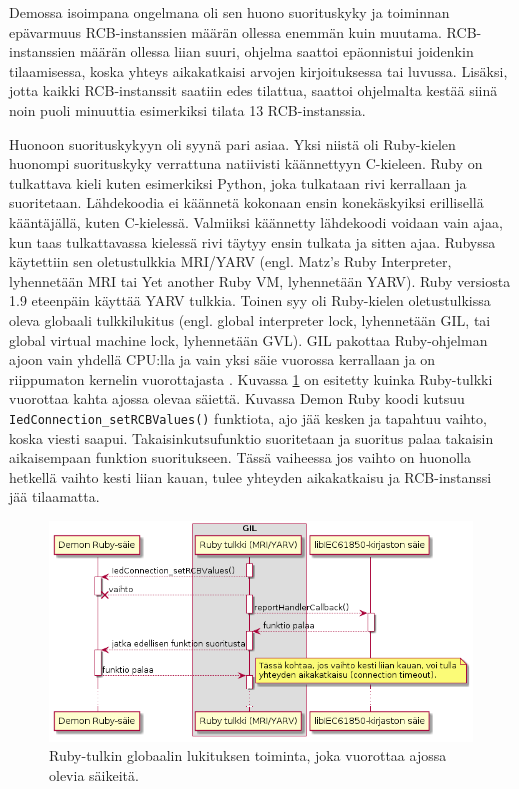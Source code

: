 Demossa isoimpana ongelmana oli sen huono suorituskyky ja toiminnan epävarmuus RCB-instanssien määrän ollessa enemmän kuin muutama. RCB-instanssien määrän ollessa liian suuri, ohjelma saattoi epäonnistui joidenkin tilaamisessa, koska yhteys aikakatkaisi arvojen kirjoituksessa tai luvussa. Lisäksi, jotta kaikki RCB-instanssit saatiin edes tilattua, saattoi ohjelmalta kestää siinä noin puoli minuuttia esimerkiksi tilata 13 RCB-instanssia.

Huonoon suorituskykyyn oli syynä pari asiaa. Yksi niistä oli Ruby-kielen huonompi suorituskyky verrattuna natiivisti käännettyyn C-kieleen. Ruby on tulkattava kieli kuten esimerkiksi Python, joka tulkataan rivi kerrallaan ja suoritetaan. Lähdekoodia ei käännetä kokonaan ensin konekäskyiksi erillisellä kääntäjällä, kuten C-kielessä. Valmiiksi käännetty lähdekoodi voidaan vain ajaa, kun taas tulkattavassa kielessä rivi täytyy ensin tulkata ja sitten ajaa. Rubyssa käytettiin sen oletustulkkia MRI/YARV (engl. Matz's Ruby Interpreter, lyhennetään MRI tai Yet another Ruby VM, lyhennetään YARV). Ruby versiosta 1.9 eteenpäin käyttää YARV tulkkia. Toinen syy oli Ruby-kielen oletustulkissa oleva globaali tulkkilukitus (engl. global interpreter lock, lyhennetään GIL, tai global virtual machine lock, lyhennetään GVL). GIL pakottaa Ruby-ohjelman ajoon vain yhdellä CPU:lla ja vain yksi säie vuorossa kerrallaan ja on riippumaton kernelin vuorottajasta \cite[s.~131--133]{Odaira2014}. Kuvassa \ref{fig:ruby-gil} on esitetty kuinka Ruby-tulkki vuorottaa kahta ajossa olevaa säiettä. Kuvassa Demon Ruby koodi kutsuu \texttt{IedConnection\_setRCBValues()} funktiota, ajo jää kesken ja tapahtuu vaihto, koska viesti saapui. Takaisinkutsufunktio suoritetaan ja suoritus palaa takaisin aikaisempaan funktion suoritukseen. Tässä vaiheessa jos vaihto on huonolla hetkellä vaihto kesti liian kauan, tulee yhteyden aikakatkaisu ja RCB-instanssi jää tilaamatta.

\begin{figure}
	\includegraphics[width=1\textwidth]{pictures/ruby-gil.png}
	\caption{Ruby-tulkin globaalin lukituksen toiminta, joka vuorottaa ajossa olevia säikeitä.}
	\label{fig:ruby-gil}
\end{figure}

